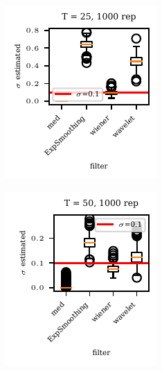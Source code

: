 \documentclass[oneside]{article}
\theoremstyle{plain}%
\theoremstyle{definition}
\begin{document}
\begin{figure}
  \centering
    \begin{subfigure}{0.48\textwidth}
        \includegraphics[width=\textwidth]{plots/std_estimation/std_estimation_boxplot_25.pdf}
    \end{subfigure}
    \begin{subfigure}{0.48\textwidth}
        \includegraphics[width=\textwidth]{plots/std_estimation/std_estimation_boxplot_50.pdf}
    \end{subfigure}


\end{figure}
\end{document}
